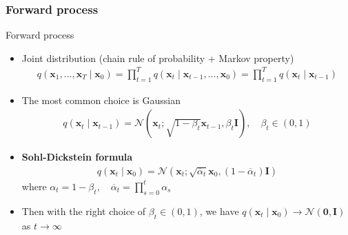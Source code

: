 \documentclass{beamer}
\begin{document}
\subsubsection{Forward process}
\begin{frame}{Forward process}
\begin{itemize}
  \item Joint distribution (chain rule of probability + Markov property)
  \begin{align}
    q(\mathbf{x}_1, ..., \mathbf{x}_T \mid \mathbf{x}_0) = \prod_{t=1}^{T}{q(\mathbf{x}_t \mid \mathbf{x}_{t-1}, ..., \mathbf{x}_0)} = \prod_{t=1}^{T}{q(\mathbf{x}_t \mid \mathbf{x}_{t-1})}\label{eq:marginal-q}
  \end{align}
  \item The most common choice is Gaussian 
  \begin{align}
    q(\mathbf{x}_{t} \mid \mathbf{x}_{t-1}) = \mathcal{N}(\mathbf{x}_t ; \sqrt{1-\beta_t}\mathbf{x}_{t-1},\beta_t \mathbf{I}), \quad \beta_t \in (0, 1)
  \end{align}
  \item \textbf{Sohl-Dickstein formula}
  \begin{align}
    q(\mathbf{x}_{t} \mid \mathbf{x}_{0}) = \mathcal{N}(\mathbf{x}_{t}; \sqrt{ \overline{\alpha}_{t} }\mathbf{x}_{0} , (1-\overline{\alpha}_{t} )\mathbf{I})
  \end{align}
  where $\alpha_{t} = 1 -\beta_{t}, \quad \overline{\alpha}_{t}=\prod_{s=0}^{t}{\alpha_{s}}$
  \item Then with the right choice of $\beta_t \in (0, 1)$, we have $q(\mathbf{x}_t \mid \mathbf{x}_0) \to \mathcal{N}(\mathbf{0}, \mathbf{I})$ as $t \to \infty$
\end{itemize}
\end{frame}
\end{document}
